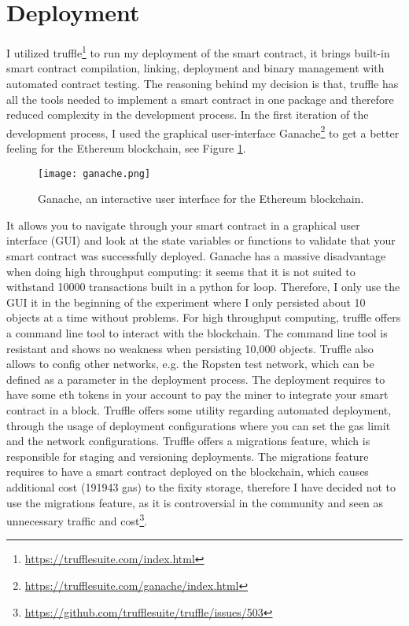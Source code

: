 \section{Deployment}
I utilized truffle\footnote{\url{https://trufflesuite.com/index.html}} to run my deployment of the smart contract, it brings built-in smart contract compilation, linking, deployment and binary management with automated contract testing. The reasoning behind my decision is that, truffle has all the tools needed to implement a smart contract in one package and therefore reduced complexity in the development process. In the first iteration of the development process, I used the graphical user-interface Ganache\footnote{\url{https://trufflesuite.com/ganache/index.html}} to get a better feeling for the Ethereum blockchain, see Figure \ref{fig:ganache}.
\begin{figure}[t]
  \centering
  \texttt{[image: ganache.png]}
  \caption{Ganache, an interactive user interface for the Ethereum blockchain.}
  \label{fig:ganache}
\end{figure}
It allows you to navigate through your smart contract in a graphical user interface (GUI) and look at the state variables or functions to validate that your smart contract was successfully deployed. Ganache has a massive disadvantage when doing high throughput computing: it seems that it is not suited to withstand 10000 transactions built in a python for loop. Therefore, I only use the GUI it in the beginning of the experiment where I only persisted about 10 objects at a time without problems. For high throughput computing, truffle offers a command line tool to interact with the blockchain. The command line tool is resistant and shows no weakness when persisting 10,000 objects.
Truffle also allows to config other networks, e.g. the Ropsten test network, which can be defined as a parameter in the deployment process. The deployment requires to have some \acrlong{eth} tokens in your account to pay the miner to integrate your smart contract in a block. 
Truffle offers some utility regarding automated deployment, through the usage of deployment configurations where you can set the gas limit and the network configurations. Truffle offers a migrations feature, which is responsible for staging and versioning deployments. The migrations feature requires to have a smart contract deployed on the blockchain, which causes additional cost (191943 gas) to the fixity storage, therefore I have decided not to use the migrations feature, as it is controversial in the community and seen as unnecessary traffic and cost\footnote{\url{https://github.com/trufflesuite/truffle/issues/503}}.
